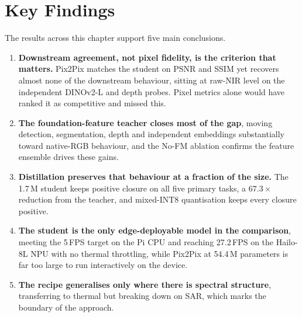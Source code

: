 \section{Key Findings}
\label{sec:res_summary}

The results across this chapter support five main conclusions.

\begin{enumerate}
    \item \textbf{Downstream agreement, not pixel fidelity, is the criterion that matters.} Pix2Pix matches the student on PSNR and SSIM yet recovers almost none of the downstream behaviour, sitting at raw-NIR level on the independent DINOv2-L and depth probes. Pixel metrics alone would have ranked it as competitive and missed this.
    \item \textbf{The foundation-feature teacher closes most of the gap}, moving detection, segmentation, depth and independent embeddings substantially toward native-RGB behaviour, and the No-FM ablation confirms the feature ensemble drives these gains.
    \item \textbf{Distillation preserves that behaviour at a fraction of the size.} The 1.7\,M student keeps positive closure on all five primary tasks, a $67.3\times$ reduction from the teacher, and mixed-INT8 quantisation keeps every closure positive.
    \item \textbf{The student is the only edge-deployable model in the comparison}, meeting the 5\,FPS target on the Pi CPU and reaching 27.2\,FPS on the Hailo-8L NPU with no thermal throttling, while Pix2Pix at 54.4\,M parameters is far too large to run interactively on the device.
    \item \textbf{The recipe generalises only where there is spectral structure}, transferring to thermal but breaking down on SAR, which marks the boundary of the approach.
\end{enumerate}
